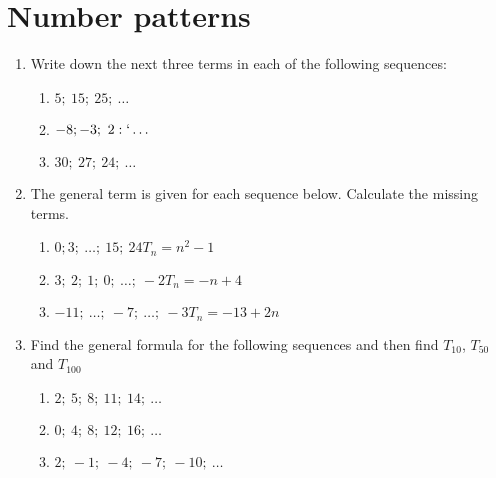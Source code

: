          \chapter{Number patterns}
\begin{exercises}{}
{ 
\begin{enumerate}[noitemsep, label=\textbf{\arabic*}. ] 
\item Write down the next three terms in each of the following sequences:
  \begin{enumerate} [noitemsep, label=\textbf{(\alph*)} ]
  \item $5;~15;~25;~\ldots$
  \item $-8;-3;~2:`\ldots$
  \item $30;~27;~24;~\ldots$
  \end{enumerate}
 \item The general term is given for each sequence below. Calculate the missing terms.
  \begin{enumerate} [noitemsep, label=\textbf{(\alph*)} ]
  \item $0;3;~\ldots;~15;~24$\hspace{2.2cm}$T_{n}={n}^{2}-1$
  \item $3;~2;~1;~0;~\ldots;~-2$\hspace{2cm}$T_{n}=-n+4$
  \item $-11;~\ldots;~-7;~\ldots;~-3$\hspace{1.5cm}$T_{n}=-13+2n$
  \end{enumerate}
\item Find the general formula for the following sequences and then find ${T}_{10}$, ${T}_{50}$ and ${T}_{100}$
  \begin{enumerate}[noitemsep, label=\textbf{(\alph*)} ]
  \item $2;~5;~8;~11;~14;~\ldots$
  \item $0;~4;~8;~12;~16;~\ldots$
  \item $2;~-1;~-4;~-7;~-10;~\ldots$
  \end{enumerate}
\end{enumerate}

}%
\end{exercises}


